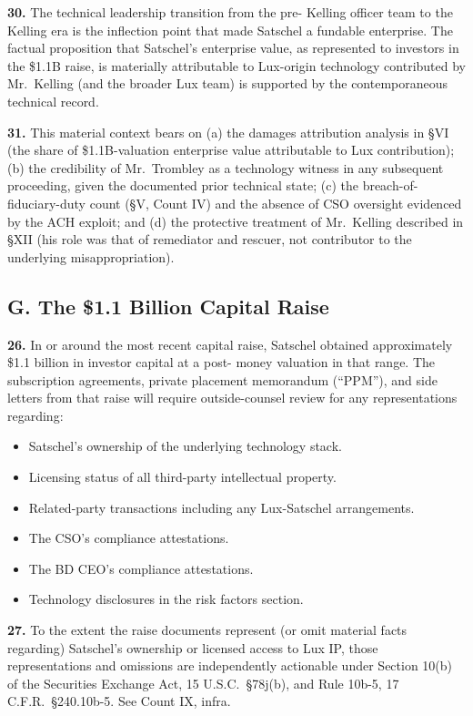 \documentclass[11pt,letterpaper]{article}
\begin{document}
\textbf{30.} The technical leadership transition from the pre-
Kelling officer team to the Kelling era is the inflection point that
made Satschel a fundable enterprise. The factual proposition that
Satschel's enterprise value, as represented to investors in the
\$1.1B raise, is materially attributable to Lux-origin technology
contributed by Mr.\ Kelling (and the broader Lux team) is supported
by the contemporaneous technical record.

\textbf{31.} This material context bears on (a) the damages
attribution analysis in \S VI (the share of \$1.1B-valuation
enterprise value attributable to Lux contribution); (b) the
credibility of Mr.\ Trombley as a technology witness in any
subsequent proceeding, given the documented prior technical state;
(c) the breach-of-fiduciary-duty count (\S V, Count IV) and the
absence of CSO oversight evidenced by the ACH exploit; and (d) the
protective treatment of Mr.\ Kelling described in \S XII (his role
was that of remediator and rescuer, not contributor to the
underlying misappropriation).

\subsection*{G. The \$1.1 Billion Capital Raise}

\textbf{26.} In or around the most recent capital raise, Satschel
obtained approximately \$1.1 billion in investor capital at a post-
money valuation in that range. The subscription agreements, private
placement memorandum (``PPM''), and side letters from that raise will
require outside-counsel review for any representations regarding:

\begin{itemize}[leftmargin=2em,itemsep=0.1em]
\item Satschel's ownership of the underlying technology stack.
\item Licensing status of all third-party intellectual property.
\item Related-party transactions including any Lux-Satschel
arrangements.
\item The CSO's compliance attestations.
\item The BD CEO's compliance attestations.
\item Technology disclosures in the risk factors section.
\end{itemize}

\textbf{27.} To the extent the raise documents represent (or omit
material facts regarding) Satschel's ownership or licensed access to
Lux IP, those representations and omissions are independently
actionable under Section 10(b) of the Securities Exchange Act, 15
U.S.C.\ \S 78j(b), and Rule 10b-5, 17 C.F.R.\ \S 240.10b-5. See
Count IX, infra.
\end{document}
